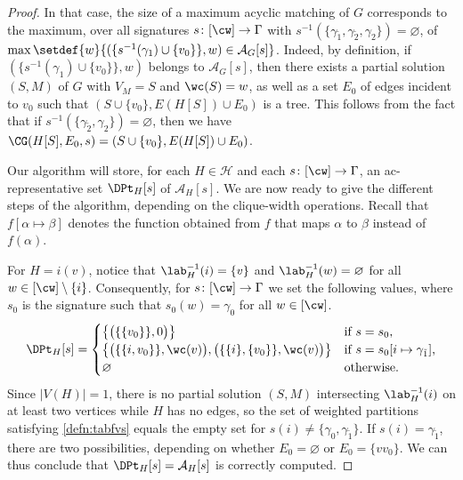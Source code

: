 \begin{proof}
    In that case, the size of a maximum acyclic matching of $G$ corresponds to the maximum,
    over all signatures $s \colon [\cw] \to \Gamma$
    with $s^{-1}(\{\gamma_{\tilde{1}},\gamma_{\tilde{2}},\gamma_{2}\}) = \varnothing$,
    of $\max \setdef{w}{(\{ s^{-1}(\gamma_{1}) \cup \{v_0\} \},w) \in \mathcal{A}_G[s]}$.
    Indeed, by definition, if $(\{ s^{-1}(\gamma_{1}) \cup \{v_0\} \},w)$ belongs to $\mathcal{A}_{G}[s]$,
    then there exists a partial solution $(S,M)$ of $G$ with $V_M=S$ and $\wc(S)=w$,
    as well as a set $E_0$ of edges incident to $v_0$ such that $(S \cup \{v_0\},E(H[S]) \cup E_0)$ is a tree.
    This follows from the fact that if $s^{-1}(\{\gamma_{\tilde{2}},\gamma_{2}\}) = \varnothing$,
    then we have $\CG(H[S],E_0,s) = (S \cup \{v_0\}, E(H[S]) \cup E_0)$.

    Our algorithm will store, for each $H \in \mathcal{H}$ and each $s \colon [\cw] \to \Gamma$,
    an ac-representative set $\DPt_H[s]$ of $\mathcal{A}_H[s]$.
    We are now ready to give the different steps of the algorithm, depending on the clique-width operations.
    Recall that $f[\alpha \mapsto \beta]$ denotes the function obtained from $f$
    that maps $\alpha$ to $\beta$ instead of $f(\alpha)$.

    For $H = i(v)$, notice that $\lab^{-1}_H(i) = \{v\}$ and $\lab^{-1}_H(w) = \varnothing$ for all $w \in [\cw] \setminus \{i\}$.
    Consequently, for $s \colon [\cw] \to \Gamma$ we set the following values,
    where $s_0$ is the signature such that $s_0(w)=\gamma_0$ for all $w \in [\cw]$.
    \[
        \DPt_H[s] =
            \begin{cases}
                \bigl\{ \bigl( \{\{v_0\} \} ,0 \bigr) \bigr\}                                                   &\text{if $s = s_0$,}\\
                \bigl\{ \bigl( \{\{i,v_0\}\}, \wc(v) \bigr), \bigl( \{\{i\},\{v_0\}\}, \wc(v) \bigr) \bigr\}    &\text{if $s = s_0 [i \mapsto \gamma_{\tilde{1}}]$,}\\
                \varnothing                                                                                     &\text{otherwise.}
            \end{cases}
    \]
    Since $|V(H)|=1$, there is no partial solution $(S,M)$ intersecting $\lab^{-1}_H(i)$ on at least two vertices while $H$ has no edges,
    so the set of weighted partitions satisfying \cref{defn:tabfvs} equals the empty set for $s(i) \neq \{\gamma_0,\gamma_{\tilde{1}}\}$.
    If $s(i) = \gamma_{\tilde{1}}$, there are two possibilities, depending on whether $E_0 = \varnothing$ or
    $E_0 = \{v v_0\}$.
    We can thus conclude that $\DPt_H[s] = \mathcal{A}_H[s]$ is correctly computed.


\end{proof}
